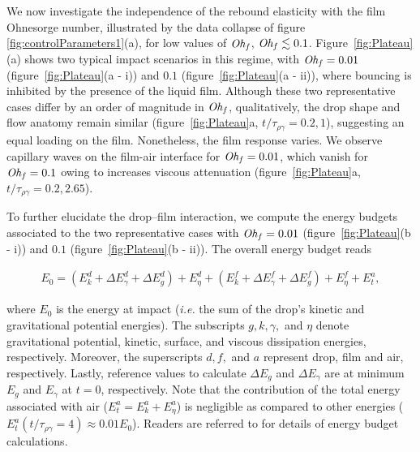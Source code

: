 We now investigate the independence of the rebound elasticity with the film Ohnesorge number, illustrated by the data collapse of figure \ref{fig:controlParameters1}(a), for low values of $\mathit{Oh}_\mathit{f}$,  $\mathit{Oh}_\mathit{f}  \lesssim 0.1$.
Figure~\ref{fig:Plateau}(a) shows two typical impact scenarios in this regime, with $\mathit{Oh}_\mathit{f} = 0.01$ (figure~\ref{fig:Plateau}(a - i)) and $0.1$ (figure~\ref{fig:Plateau}(a - ii)), where bouncing is inhibited by the presence of the liquid film. 
Although these two representative cases differ by an order of magnitude in $\mathit{Oh}_\mathit{f}$, qualitatively, the drop shape and flow anatomy remain similar (figure~\ref{fig:Plateau}a, $t/\tau_{\rho\gamma} = 0.2, 1$), suggesting an equal loading on the film. 
Nonetheless, the film response varies. 
We observe capillary waves on the film-air interface for $\mathit{Oh}_\mathit{f} = 0.01$, which vanish for $\mathit{Oh}_\mathit{f} = 0.1$ owing to increases viscous attenuation (figure~\ref{fig:Plateau}a, $t/\tau_{\rho\gamma} = 0.2, 2.65$). 

To further elucidate the drop--film interaction, we compute the energy budgets associated to the two representative cases with $\mathit{Oh}_\mathit{f} = 0.01$ (figure~\ref{fig:Plateau}(b - i)) and $0.1$ (figure~\ref{fig:Plateau}(b - ii)). 
The overall energy budget reads

\begin{align}
	E_0 =  \left(E_k^d + \Delta E_\gamma^d + \Delta E_g^d\right) + E_\eta^d + \left(E_k^f + \Delta E_\gamma^f + \Delta E_g^f\right)  + E_\eta^f + E_t^a,
	\label{eqn:EnergyBudgetGlobal}
\end{align} 

\noindent where $E_0$ is the energy at impact (\emph{i.e.} the sum of the drop's kinetic and gravitational potential energies). The subscripts $g, k, \gamma,$ and $\eta$ denote gravitational potential, kinetic, surface, and viscous dissipation energies, respectively. Moreover, the superscripts $d, f,$ and $a$ represent drop, film and air, respectively. Lastly, reference values to calculate $\Delta E_g$ and $\Delta E_\gamma$ are at minimum $E_g$ and $E_\gamma$ at $t = 0$, respectively. Note that the contribution of the total energy associated with air ($E_t^a = E_k^a + E_\eta^a$) is negligible as compared to other energies ($E_t^a(t/\tau_{\rho\gamma} = 4) \approx 0.01E_0$). Readers are referred to \citet{landau2013course, wildeman2016spreading, ramirez2020lifting, sanjay2022taylor} for details of energy budget calculations. 

